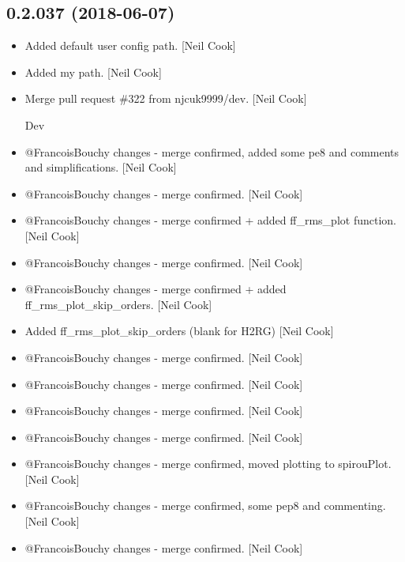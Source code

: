 \documentclass[a4paper,10pt,english]{report}
\begin{document}
\subsection{0.2.037 (2018-06-07)}
\label{\detokenize{misc/changelog:id425}}\begin{itemize}
\item {} 
Added default user config path. {[}Neil Cook{]}

\item {} 
Added my path. {[}Neil Cook{]}

\item {} 
Merge pull request \#322 from njcuk9999/dev. {[}Neil Cook{]}

Dev

\item {} 
@FrancoisBouchy changes - merge confirmed, added some pe8 and comments
and simplifications. {[}Neil Cook{]}

\item {} 
@FrancoisBouchy changes - merge confirmed. {[}Neil Cook{]}

\item {} 
@FrancoisBouchy changes - merge confirmed + added ff\_rms\_plot
function. {[}Neil Cook{]}

\item {} 
@FrancoisBouchy changes - merge confirmed. {[}Neil Cook{]}

\item {} 
@FrancoisBouchy changes - merge confirmed + added
ff\_rms\_plot\_skip\_orders. {[}Neil Cook{]}

\item {} 
Added ff\_rms\_plot\_skip\_orders (blank for H2RG) {[}Neil Cook{]}

\item {} 
@FrancoisBouchy changes - merge confirmed. {[}Neil Cook{]}

\item {} 
@FrancoisBouchy changes - merge confirmed. {[}Neil Cook{]}

\item {} 
@FrancoisBouchy changes - merge confirmed. {[}Neil Cook{]}

\item {} 
@FrancoisBouchy changes - merge confirmed. {[}Neil Cook{]}

\item {} 
@FrancoisBouchy changes - merge confirmed, moved plotting to
spirouPlot. {[}Neil Cook{]}

\item {} 
@FrancoisBouchy changes - merge confirmed, some pep8 and commenting.
{[}Neil Cook{]}

\item {} 
@FrancoisBouchy changes - merge confirmed. {[}Neil Cook{]}

\end{itemize}
\end{document}
